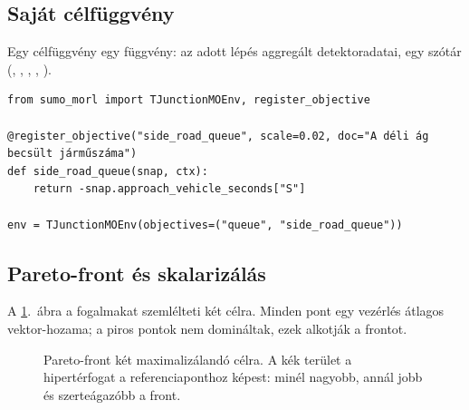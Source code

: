 \documentclass[11pt,a4paper]{article}
\begin{document}
\subsection{Saját célfüggvény}

Egy célfüggvény egy  függvény:  az adott lépés aggregált
detektoradatai,  egy szótár (, , , ,
).

\begin{lstlisting}
from sumo_morl import TJunctionMOEnv, register_objective

@register_objective("side_road_queue", scale=0.02, doc="A déli ág becsült járműszáma")
def side_road_queue(snap, ctx):
    return -snap.approach_vehicle_seconds["S"]

env = TJunctionMOEnv(objectives=("queue", "side_road_queue"))
\end{lstlisting}

\subsection{Pareto-front és skalarizálás}

A \ref{fig:pareto}.~ábra a fogalmakat szemlélteti két célra. Minden pont egy vezérlés átlagos
vektor-hozama; a piros pontok nem domináltak, ezek alkotják a frontot.

\begin{figure}[h]
\centering
{}
\caption{Pareto-front két maximalizálandó célra. A kék terület a hipertérfogat a referenciaponthoz
  képest: minél nagyobb, annál jobb és szerteágazóbb a front.}
\label{fig:pareto}
\end{figure}
\end{document}
